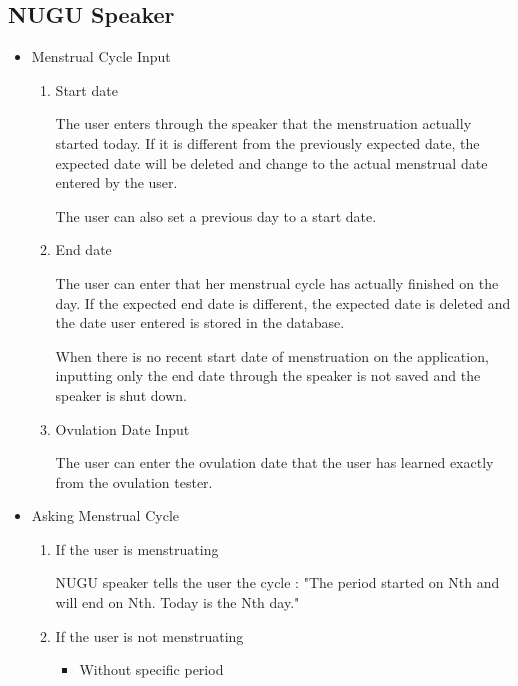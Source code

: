 \documentclass[conference]{IEEEtran}
\begin{document}
\subsection{NUGU Speaker}
\begin{itemize}
\setlength{\parindent}{2ex}
    \item Menstrual Cycle Input
    \begin{enumerate}
        \item Start date 
        
       \setlength{\parindent}{2ex} The user enters through the speaker that the menstruation actually started today. If it is different from the previously expected date, the expected date will be deleted and change to the actual menstrual date entered by the user.
        
        \setlength{\parindent}{2ex}The user can also set a previous day to a start date.
        \item End date 
        
        \setlength{\parindent}{2ex}The user can enter that her menstrual cycle has actually finished on the day. If the expected end date is different, the expected date is deleted and the date user entered is stored in the database. 
        
        \setlength{\parindent}{2ex}When there is no recent start date of menstruation on the application, inputting only the end date through the speaker is not saved and the speaker is shut down.
        \item Ovulation Date Input
    
        \setlength{\parindent}{2ex}The user can enter the ovulation date that the user has learned exactly from the ovulation tester.
    
    \end{enumerate}
    \item Asking Menstrual Cycle

    \begin{enumerate}
        \item If the user is menstruating
        
        \setlength{\parindent}{2ex} NUGU speaker tells the user the cycle : "The period started on Nth and will end on Nth. Today is the Nth day."
        \item If the user is not menstruating
        
        \begin{itemize}
            \item Without specific period 
            

\end{itemize}
\end{enumerate}
\end{itemize}
\end{document}
